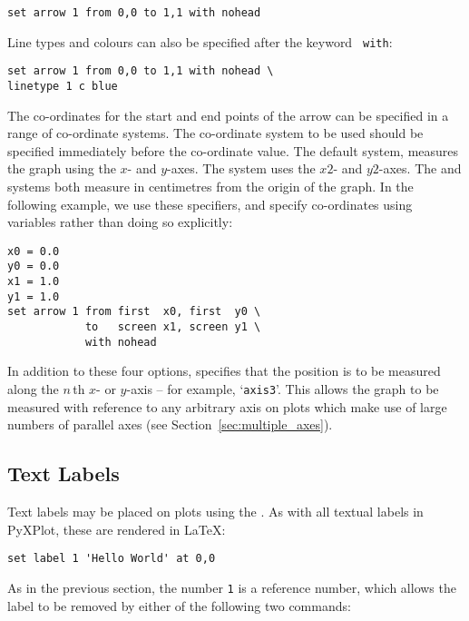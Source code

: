 \begin{verbatim}
set arrow 1 from 0,0 to 1,1 with nohead
\end{verbatim}

\noindent Line types and colours can also be specified after the keyword {\tt
with}:

\begin{verbatim}
set arrow 1 from 0,0 to 1,1 with nohead \
linetype 1 c blue
\end{verbatim}

The co-ordinates for the start and end points of the arrow can be specified in
a range of co-ordinate systems. The co-ordinate system to be used should be
specified immediately before the co-ordinate value. The default system,
\indcot{first} measures the graph using the $x$- and $y$-axes. The
\indcot{second} system uses the $x2$- and $y2$-axes. The  and
\indcot{graph} systems both measure in centimetres from the origin of the
graph. In the following example, we use these specifiers, and specify
co-ordinates using variables rather than doing so explicitly:

\begin{verbatim}
x0 = 0.0
y0 = 0.0
x1 = 1.0
y1 = 1.0
set arrow 1 from first  x0, first  y0 \
            to   screen x1, screen y1 \
            with nohead
\end{verbatim}

In addition to these four options,  specifies that the
position is to be measured along the $n\,$th $x$- or $y$-axis -- for example,
`{\tt axis3}'. This allows the graph to be measured with
reference to any arbitrary axis on plots which make use of large numbers of
parallel axes (see Section~\ref{sec:multiple_axes}).

\subsection{Text Labels}

Text labels may be placed on plots using the . As with all
textual labels in PyXPlot, these are rendered in \LaTeX:

\begin{verbatim}
set label 1 'Hello World' at 0,0
\end{verbatim}

As in the previous section, the number {\tt 1} is a reference number, which
allows the label to be removed by either of the following two commands:

